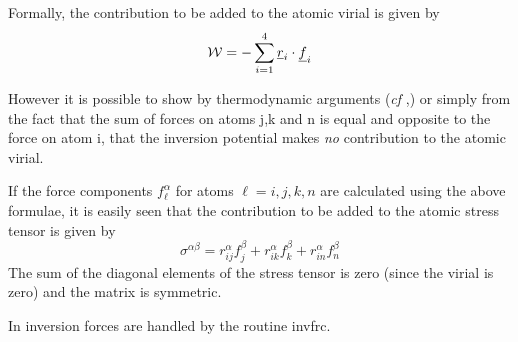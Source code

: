 Formally, the contribution to be added to the
atomic virial is given by
\begin{equation}
{\cal W}=-\sum_{i=1}^{4}\mbox{$\underline{r}$}_{i}\cdot\mbox{$\underline{f}$}_{i}
\end{equation}

However it is possible to show by thermodynamic arguments ({\em cf}
\cite{smith-93c},) or simply from the fact that the sum of forces on
atoms j,k and n is equal and opposite to the force on atom i, that the
inversion potential makes {\em no} contribution to the atomic virial.

If the force components $f_{\ell}^{\alpha}$ for atoms $\ell=i,j,k,n$ are
calculated using the above formulae, it is easily seen that
the contribution to be added to the atomic stress tensor is given by
\begin{equation}
\sigma^{\alpha \beta}=r_{ij}^{\alpha}f_{j}^{\beta}+
r_{ik}^{\alpha}f_{k}^{\beta}+r_{in}^{\alpha}f_{n}^{\beta}
\end{equation}
The sum of the diagonal elements of the stress tensor is zero (since
the virial is zero) and the matrix is symmetric.

In \D{} inversion forces are handled by the routine {\sc invfrc}.

